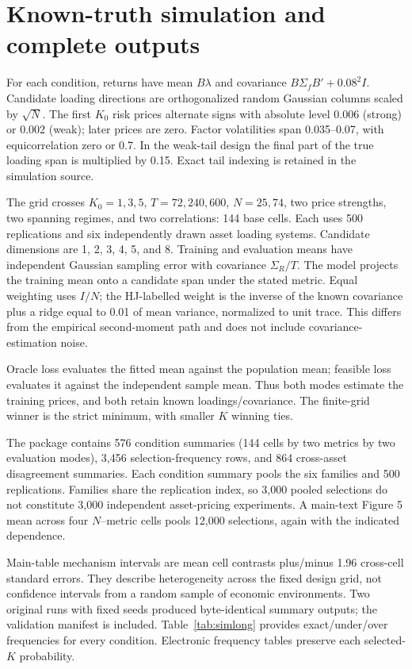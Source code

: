 \documentclass[11pt]{article}
\begin{document}


\section{Known-truth simulation and complete outputs}
\setcounter{equation}{0}
For each condition, returns have mean $B\lambda$ and covariance $B\Sigma_fB'+0.08^2I$. Candidate loading directions are orthogonalized random Gaussian columns scaled by $\sqrt N$. The first $K_0$ risk prices alternate signs with absolute level 0.006 (strong) or 0.002 (weak); later prices are zero. Factor volatilities span 0.035--0.07, with equicorrelation zero or 0.7. In the weak-tail design the final part of the true loading span is multiplied by 0.15. Exact tail indexing is retained in the simulation source.

The grid crosses $K_0=1,3,5$, $T=72,240,600$, $N=25,74$, two price strengths, two spanning regimes, and two correlations: 144 base cells. Each uses 500 replications and six independently drawn asset loading systems. Candidate dimensions are 1, 2, 3, 4, 5, and 8. Training and evaluation means have independent Gaussian sampling error with covariance $\Sigma_R/T$. The model projects the training mean onto a candidate span under the stated metric. Equal weighting uses $I/N$; the HJ-labelled weight is the inverse of the known covariance plus a ridge equal to 0.01 of mean variance, normalized to unit trace. This differs from the empirical second-moment path and does not include covariance-estimation noise.

Oracle loss evaluates the fitted mean against the population mean; feasible loss evaluates it against the independent sample mean. Thus both modes estimate the training prices, and both retain known loadings/covariance. The finite-grid winner is the strict minimum, with smaller $K$ winning ties.

The package contains 576 condition summaries (144 cells by two metrics by two evaluation modes), 3,456 selection-frequency rows, and 864 cross-asset disagreement summaries. Each condition summary pools the six families and 500 replications. Families share the replication index, so 3,000 pooled selections do not constitute 3,000 independent asset-pricing experiments. A main-text Figure 5 mean across four $N$--metric cells pools 12,000 selections, again with the indicated dependence.

Main-table mechanism intervals are mean cell contrasts plus/minus 1.96 cross-cell standard errors. They describe heterogeneity across the fixed design grid, not confidence intervals from a random sample of economic environments. Two original runs with fixed seeds produced byte-identical summary outputs; the validation manifest is included. Table~\ref{tab:simlong} provides exact/under/over frequencies for every condition. Electronic frequency tables preserve each selected-$K$ probability.
\end{document}

